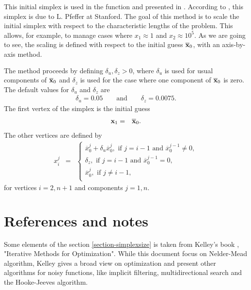 This initial simplex is used in the function 
and presented in \cite{Fan2002}. According to \cite{Fan2002}, this simplex is due to L. Pfeffer at Stanford.
The goal of this method is to scale the initial simplex with respect 
to the characteristic lengths of the problem. This allows, for example,
to manage cases where $x_1\approx 1$ and $x_2\approx 10^5$.
As we are going to see, the scaling is defined with respect to the 
initial guess $\overline{\mathbf{x}}_0$, with an axis-by-axis method.

The method proceeds by defining $\delta_u,\delta_z>0$, where 
$\delta_u$ is used for usual components of $\overline{\mathbf{x}}_0$ and $\delta_z$ is 
used for the case where one component of $\overline{\mathbf{x}}_0$ is zero.
The default values for $\delta_u$ and $\delta_z$ are 
\begin{eqnarray}
\delta_u = 0.05 \qquad \textrm{and} \qquad \delta_z = 0.0075.
\end{eqnarray}
The first vertex of the simplex is the initial guess 
\begin{eqnarray}
\mathbf{x}_1 &=& \overline{\mathbf{x}}_0.
\end{eqnarray}
The other vertices are defined by 
\begin{eqnarray}
x_i^j &=& \left\{
\begin{array}{l}
\overline{x}_0^j + \delta_u \overline{x}_0^j, \textrm{ if } j=i-1 \textrm{ and } \overline{x}_0^{j-1}\neq 0,\\
\delta_z, \textrm{ if } j=i-1 \textrm{ and } \overline{x}_0^{j-1}= 0,\\
\overline{x}_0^j, \textrm{ if } j\neq i-1,\\
\end{array}
\right.
\end{eqnarray}
for vertices $i=2,n+1$ and components $j=1,n$.



\section{References and notes}

Some elements of the section \ref{section-simplexsize} is taken from 
Kelley's book \cite{Kelley1999}, "Iterative Methods for Optimization".
While this document focus on Nelder-Mead algorithm, Kelley gives a broad
view on optimization and present other algorithms for noisy functions,
like implicit filtering, multidirectional search and the Hooke-Jeeves algorithm.

